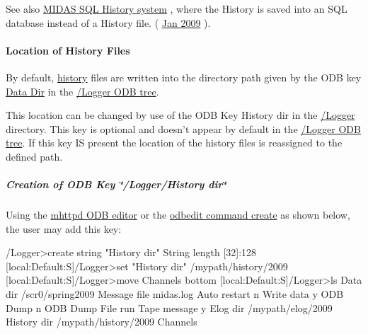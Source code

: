  See also \hyperlink{F_History_logging_F_History_sql_internal}{MIDAS SQL History system} , where the History is saved into an SQL database instead of a History file. ( \hyperlink{NDF_ndf_jan_2009}{Jan 2009} ). \hypertarget{F_History_logging_F_Logger_History_Files_Location}{}\paragraph{Location of History Files}\label{F_History_logging_F_Logger_History_Files_Location}
\label{F_History_logging_F_Logger_History_Dir}
\hypertarget{F_History_logging_F_Logger_History_Dir}{}


\label{F_History_logging_idx_history_files_location}
\hypertarget{F_History_logging_idx_history_files_location}{}
 By default, \hyperlink{F_History_logging}{history} files are written into the directory path given by the ODB key \hyperlink{F_Logging_Data_F_Logger_Data_Dir}{Data Dir} in the \hyperlink{F_Logging_Data_F_Logger_tree}{/Logger ODB tree}.

This location can be changed by use of the ODB Key History dir in the \hyperlink{F_Logging_Data_F_Logger_tree_keys}{/Logger} directory. This key is optional and doesn't appear by default in the \hyperlink{F_Logging_Data_F_Logger_tree}{/Logger ODB tree}. If this key IS present the location of the history files is reassigned to the defined path.\hypertarget{F_History_logging_F_Logger_Create_History_Dir}{}\subparagraph{Creation of ODB Key  \char`\"{}/Logger/History dir\char`\"{}}\label{F_History_logging_F_Logger_Create_History_Dir}
Using the \hyperlink{RC_mhttpd_ODB_page}{mhttpd ODB editor} or the \hyperlink{RC_odbedit_examples_RC_odbedit_cr}{odbedit command create} as shown below, the user may add this key: 
\begin{DoxyCode}
/Logger>create string "History dir"
String length [32]:128
[local:Default:S]/Logger>set "History dir" /mypath/history/2009
[local:Default:S]/Logger>move Channels bottom
[local:Default:S]/Logger>ls
  Data dir                        /scr0/spring2009
  Message file                    midas.log 
  Auto restart                     n
  Write data                      y
  ODB Dump                        n
  ODB Dump File                   run%
  Tape message                    y 
  Elog dir                        /mypath/elog/2009
  History dir                     /mypath/history/2009
  Channels
\end{DoxyCode}


\par
 

